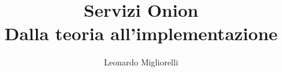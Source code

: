 \documentclass{unicam_thesis}
\title{Servizi Onion \\ Dalla teoria all'implementazione }
\author{Leonardo Migliorelli}%
\theoremstyle{definition} \newtheorem{esempio}{Esempio}[chapter]
\theoremstyle{definition}
\begin{document}
\maketitle
\tableofcontents
\lstlistoflistings
\listoffigures
\listoftables








\appendix
%
%
%

\printbibliography

\printindex


\end{document}
